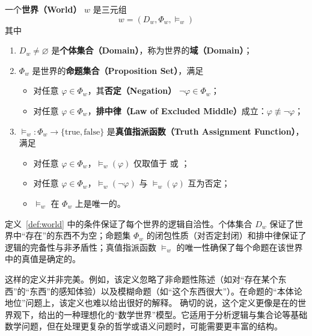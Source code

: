 \begin{definition}[世界]\label{def:world}
    一个\textbf{世界（World）} $w$ 是三元组
    \begin{equation}
        w=(D_w,\Phi_w,\models_w)
    \end{equation}
    其中
    \begin{enumerate}
        \item $D_w\neq\varnothing$ 是\textbf{个体集合（Domain）}，称为世界的\textbf{域（Domain）}；
        \item $\Phi_w$ 是世界的\textbf{命题集合（Proposition Set）}，满足
              \begin{itemize}
                  \item 对任意 $\varphi\in\Phi_w$，其\textbf{否定（Negation）} $\neg\varphi\in\Phi_w$；
                  \item 对任意 $\varphi\in\Phi_w$，\textbf{排中律（Law of Excluded Middle）}成立：$\varphi\not\equiv\neg\varphi$；
              \end{itemize}
        \item $\models_w : \Phi_w \to \{\text{true}, \text{false}\}$ 是\textbf{真值指派函数（Truth Assignment Function）}，满足
              \begin{itemize}
                  \item 对任意 $\varphi\in\Phi_w$，$\models_w(\varphi)$ 仅取值于  或 ；
                  \item 对任意 $\varphi\in\Phi_w$，$\models_w(\neg\varphi)$ 与 $\models_w(\varphi)$ 互为否定；
                  \item $\models_w$ 在 $\Phi_w$ 上是唯一的。
              \end{itemize}
    \end{enumerate}
\end{definition}

\begin{remark}
    定义~\ref{def:world} 中的条件保证了每个世界的逻辑自洽性。个体集合 $D_w$ 保证了世界中“存在”的东西不为空；命题集 $\Phi_w$ 的闭包性质（对否定封闭）和排中律保证了逻辑的完备性与非矛盾性；真值指派函数 $\models_w$ 的唯一性确保了每个命题在该世界中的真值是确定的。
\end{remark}

\begin{remark}
    这样的定义并非完美。例如，该定义忽略了非命题性陈述（如对“存在某个东西”的“东西”的感知体验）以及模糊命题（如“这个东西很大”）。在命题的“本体论地位”问题上，该定义也难以给出很好的解释。
    确切的说，这个定义更像是在\wkn{}的世界观下，给出的一种理想化的“数学世界”模型。它适用于分析逻辑与集合论等基础数学问题，但在处理更复杂的哲学或语义问题时，可能需要更丰富的结构。
\end{remark}

